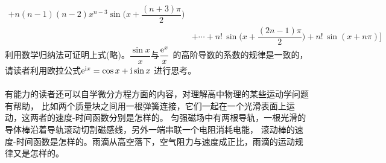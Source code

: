 \begin{enumerate}[label={【\textbf{例\thechapter.\arabic*}】},
 leftmargin=\inteval{\myenumleftmargin}pt,
 itemsep=\inteval{\myenumitempsep}pt,
 itemindent=\inteval{\myenumitemindent}pt]
\begin{align*}
    +n(n-1)(n-2)x^{n-3}\sin \Big(x+\dfrac{(n+3)\pi}{2}\Big)  \\
    & +\cdots +n!\,\sin\Big(x+\dfrac{(2n-1)\pi}{2}\Big)+
    n!\,\sin(x+n\pi)\Bigg]
\end{align*}
利用数学归纳法可证明上式(略)。$ \dfrac{\sin x}{x} $与$ \dfrac{\mathrm{e}^x}{x} $
的高阶导数的系数的规律是一致的，请读者利用欧拉公式$ \mathrm{e}^{\mathrm{i} x}=\cos x+\mathrm{i}\sin x $
进行思考。\\
\\
有能力的读者还可以自学微分方程方面的内容，对理解高中物理的某些运动学问题有帮助，
比如两个质量块之间用一根弹簧连接，它们一起在一个光滑表面上运动，这两者的速度-时间函数分别是怎样的。
匀强磁场中有两根导轨，一根光滑的导体棒沿着导轨滚动切割磁感线，另外一端串联一个电阻消耗电能，
滚动棒的速度-时间函数是怎样的。雨滴从高空落下，空气阻力与速度成正比，雨滴的运动规律又是怎样的。

\end{enumerate}

